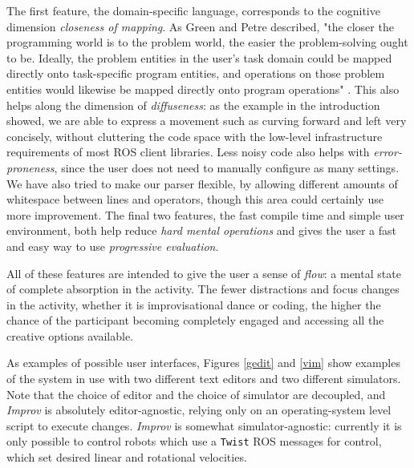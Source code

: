 \documentclass[sigchi-a]{acmart}
\begin{document}
The first feature, the domain-specific language, corresponds to the cognitive
dimension \emph{closeness of
mapping}. As Green and Petre described, "the closer the programming world is to
the problem world, the easier the problem-solving ought to be. Ideally, the
problem entities in the user's task domain could be mapped directly onto
task-specific program entities, and operations on those problem entities would
likewise be mapped directly onto program operations" \cite{green1996usability}.
This also helps along the dimension of \emph{diffuseness}: as the example in the
introduction showed, we are able to express a movement such as curving forward
and left very concisely, without cluttering the code space with the low-level
infrastructure requirements of most ROS client libraries. Less noisy code also
helps with \emph{error-proneness}, since the user does not need to manually
configure as many settings. We have also tried to make our parser flexible, by
allowing different amounts of whitespace between lines and operators, though
this area could certainly use more improvement. The final two features, the fast
compile time and simple user environment, both help reduce \emph{hard mental
operations} and gives the user a fast and easy way to use \emph{progressive
evaluation}.

All of these features are intended to give the user a sense of \emph{flow}: a
mental state of complete absorption in the activity. The fewer distractions and
focus changes in the activity, whether it is improvisational dance or coding,
the higher the chance of the participant becoming completely engaged and
accessing all the creative options available.


As examples of possible user interfaces, Figures \ref{gedit} and \ref{vim} show examples of the system in use with two
different text editors and two different simulators. Note that the choice of
editor and the choice of simulator are decoupled, and \emph{Improv} is
absolutely editor-agnostic, relying only on an operating-system level script
to execute changes. \emph{Improv} is somewhat simulator-agnostic: 
currently it is only possible to control robots which use a \texttt{Twist} ROS messages
for control, which set desired linear and rotational
velocities.
\end{document}
